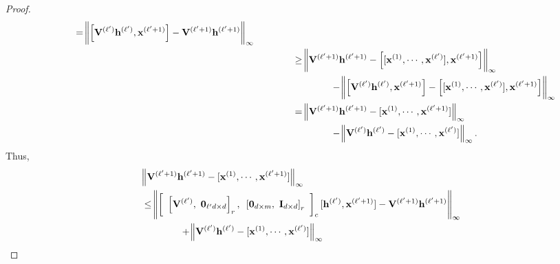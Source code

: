 \begin{proof}
\begin{align*}
		\quad \quad \quad \quad = \norm{ \left[\mathbf{V}^{(\ell')} \mathbf{h}^{(\ell')}, \mathbf{x}^{(\ell' + 1)} \right]- \mathbf{V}^{(\ell' + 1)}  \mathbf{h}^{(\ell' + 1)}}_\infty \\& 
		\quad \quad \quad \quad
		\ge \norm{ \mathbf{V}^{(\ell' + 1)}  \mathbf{h}^{(\ell' + 1)} - \left[[\mathbf{x}^{(1)}, \cdots, \mathbf{x}^{(\ell')}], \mathbf{x}^{(\ell' + 1)}\right]}_\infty\\& 
		\quad \quad \quad \quad\quad \quad \quad \quad- \norm{ \left[\mathbf{V}^{(\ell')} \mathbf{h}^{(\ell')}, \mathbf{x}^{(\ell' + 1)} \right] - \left[[\mathbf{x}^{(1)}, \cdots, \mathbf{x}^{(\ell')}], \mathbf{x}^{(\ell' + 1)}\right]}_\infty\\& 
		\quad \quad \quad \quad
		= \norm{ \mathbf{V}^{(\ell' + 1)}  \mathbf{h}^{(\ell' + 1)} - [\mathbf{x}^{(1)}, \cdots,  \mathbf{x}^{(\ell' + 1)}]}_\infty\\& 
		\quad \quad \quad \quad\quad \quad \quad \quad- \norm{ \mathbf{V}^{(\ell')} \mathbf{h}^{(\ell')} - [\mathbf{x}^{(1)}, \cdots, \mathbf{x}^{(\ell')}]}_\infty.
	\end{align*}
	\endgroup
	Thus,
	\begingroup
	\allowdisplaybreaks
	\begin{align}
		&\norm{ \bV^{(\ell' + 1)}  \mathbf{h}^{(\ell' + 1)} - [\mathbf{x}^{(1)}, \cdots,  \mathbf{x}^{(\ell' + 1)}]}_\infty \nonumber\\&
		\le \norm{ \left[\text{ }\left[\bV^{(\ell')}, \text{ } \mathbf{0}_{\ell'd \times d}\right]_r,\text{ } \left[\mathbf{0}_{d \times m},\text{ } \mathbf{I}_{d \times d}\right]_r\text{ }\right]_c [\mathbf{h}^{(\ell')}, \mathbf{x}^{(\ell' + 1)}] - \bV^{(\ell' + 1)}  \mathbf{h}^{(\ell' + 1)}}_\infty \label{eq:induction_Vl_1hl_1} \\& \quad \quad \quad \quad +  \norm{ \bV^{(\ell')} \mathbf{h}^{(\ell')} - [\mathbf{x}^{(1)}, \cdots, \mathbf{x}^{(\ell')}]}_\infty \label{eq:induction_Vlhl}

\end{align}
\end{proof}
